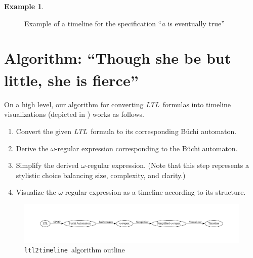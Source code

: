 \documentclass[conference]{IEEEtran}
\theoremstyle{definition}
\newtheorem{example}{Example}[section]
\theoremstyle{remark}
\newcommand{\ltl}{\textit{LTL}}
\newcommand{\Buchi}{B\"{u}chi }
\newcommand{\tool}{\texttt{ltl2timeline}}
\begin{document}
\begin{example}
\begin{figure}[!h]
        \caption{Example of a timeline for the specification ``$a$ is eventually true''}
        \label{fig:ex15}
    \end{figure}
\end{example}

\section{Algorithm: ``Though she be but little, she is fierce\textsuperscript{\textsection}''}
\begingroup\renewcommand\thefootnote{\textsection}
\endgroup
On a high level, our algorithm for converting \ltl\ formulas into timeline visualizations (depicted in ) works as follows.
\begin{enumerate}
    \item Convert the given \ltl\ formula to its corresponding \Buchi automaton. %
    \item Derive the $\omega$-regular expression corresponding to the \Buchi automaton. %
    \item Simplify the derived $\omega$-regular expression. (Note that this step represents a stylistic choice balancing size, complexity, and clarity.) %
    \item Visualize the $\omega$-regular expression as a timeline according to its structure. %
\end{enumerate}
\begin{figure}[!t]
    \centering
    \includegraphics[width=\textwidth, scale=0.3]{img/algorithm_outline.pdf}
    \caption{\tool \ algorithm outline}
    \label{fig:algo}
\end{figure}
\end{document}
